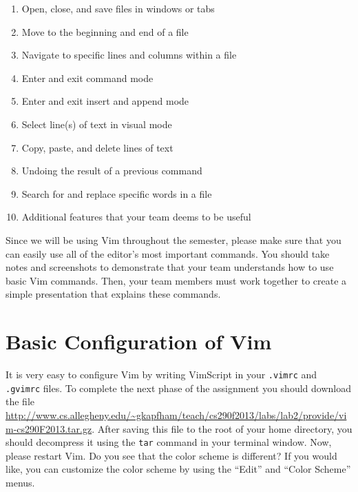 \begin{enumerate}

	\item Open, close, and save files in windows or tabs

	\item Move to the beginning and end of a file

	\item Navigate to specific lines and columns within a file

	\item Enter and exit command mode

	\item Enter and exit insert and append mode

	\item Select line(s) of text in visual mode

	\item Copy, paste, and delete lines of text

	\item Undoing the result of a previous command

	\item Search for and replace specific words in a file 

	\item Additional features that your team deems to be useful

\end{enumerate}

Since we will be using Vim throughout the semester, please make sure that you can easily use all of the editor's most
important commands.  You should take notes and screenshots to demonstrate that your team understands how to use basic
Vim commands.  Then, your team members must work together to create a simple presentation that explains these commands. 

\section*{Basic Configuration of Vim}

It is very easy to configure Vim by writing VimScript in your {\tt .vimrc} and {\tt .gvimrc} files.  To complete the next phase of
the assignment you should download the file
\url{http://www.cs.allegheny.edu/~gkapfham/teach/cs290f2013/labs/lab2/provide/vim-cs290F2013.tar.gz}.  After saving this
file to the root of your home directory, you should decompress it using the {\tt tar} command in your terminal window.
Now, please restart Vim.  Do you see that the color scheme is different? If you would like, you can customize the color
scheme by using the ``Edit'' and ``Color Scheme'' menus. 

